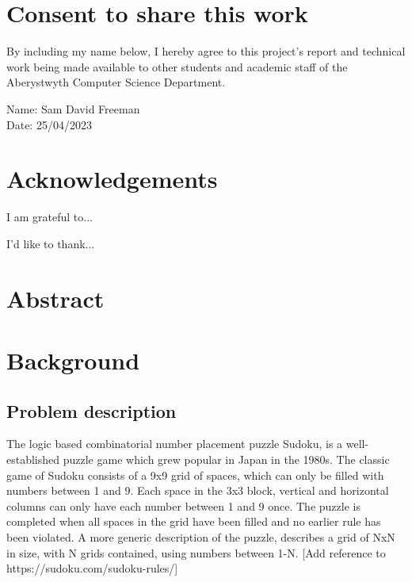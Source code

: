 \documentclass[a4paper,11pt]{article}
\begin{document}
\vspace{1em}
\section*{\centering Consent to share this work}

By including my name below, I hereby agree to this project's report and technical work being made available to other students and academic staff of the Aberystwyth Computer Science Department.  

\vspace{2em}
Name: Sam David Freeman  \\

\vspace{1em}
Date: 25/04/2023 \\
\newpage
\section*{\centering Acknowledgements}

I am grateful to...

I'd like to thank...
\newpage
\section*{\centering Abstract}

\newpage
\tableofcontents
\newpage
\section{Background}
	
\subsection{Problem description}
The logic based combinatorial number placement puzzle Sudoku, is a well-established puzzle game which grew popular in Japan in the 1980s. The classic game of Sudoku consists of a 9x9 grid of spaces, which can only be filled with numbers between 1 and 9. Each space in the 3x3 block, vertical and horizontal columns can only have each number between 1 and 9 once. The puzzle is completed when all spaces in the grid have been filled and no earlier rule has been violated. A more generic description of the puzzle, describes a grid of NxN in size, with N grids contained, using numbers between 1-N. [Add reference to https://sudoku.com/sudoku-rules/]
\end{document}
